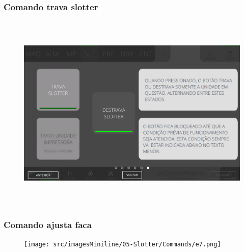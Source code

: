 \newpage
\thispagestyle{fancy}
\vspace*{40 pt}
\subsubsection{\small{Comando trava slotter}}\label{telaComandoSlotterComandoTravaSlotter}
\vspace*{\fill}
\begin{figure}[h]
  \centering
  \includegraphics[width=576px,height=360px]{src/imagesMiniline/05-Slotter/Commands/e6.png}
\end{figure}
\vspace*{\fill}

\newpage
\thispagestyle{fancy}
\vspace*{40 pt}
\subsubsection{\small{Comando ajusta faca}}\label{telaComandoSlotterComandoAjustaFaca}
\vspace*{\fill}
\begin{figure}[h]
  \centering
  \texttt{[image: src/imagesMiniline/05-Slotter/Commands/e7.png]}
\end{figure}
\vspace*{\fill}

